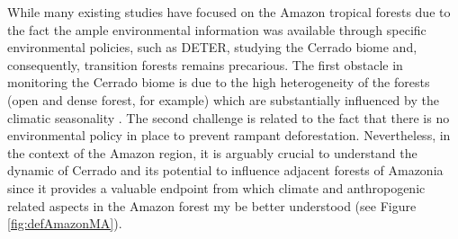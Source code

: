 
While many existing studies have focused on the Amazon tropical forests \citep{PFAFF,PFAFF2,HAMMIG,GEIST, GEIST2, LAMBIN2,PFAFF3,ZAMBRANO,KUIK,COE,SOLER,NEPSTAD,ARIMA,PATZ,CULAS11,RICHARDS,RICHARDS2,CELENTANO_2017} due to the fact the ample environmental information was available through specific environmental policies, such as DETER, studying the Cerrado biome and, consequently, transition forests remains precarious. The first obstacle in monitoring the Cerrado biome is due to the high heterogeneity of the forests (open and dense forest, for example) which are substantially influenced by the climatic seasonality \citep{bayma_sano_2015}. The second challenge is related to the fact that there is no environmental policy in place to prevent rampant deforestation.  Nevertheless, in the context of the Amazon region, it is arguably crucial to understand the dynamic of Cerrado and its potential to influence adjacent forests of Amazonia since it provides a valuable endpoint from which climate and anthropogenic related aspects in the Amazon forest my be better understood (see Figure \ref{fig:defAmazonMA}).  




